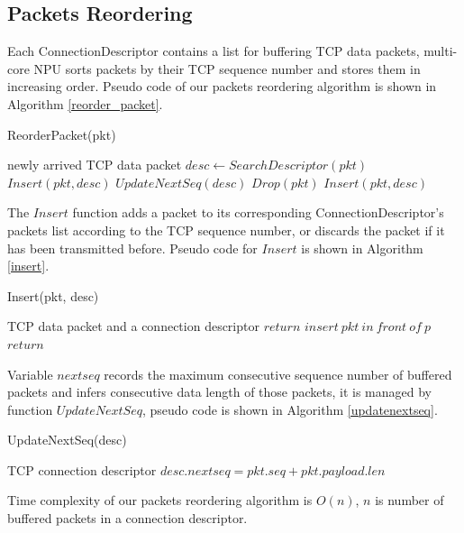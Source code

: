 \documentclass[conference]{IEEEtran}
\begin{document}
\subsection{Packets Reordering}
Each ConnectionDescriptor contains a list for buffering TCP data packets, multi-core NPU sorts packets by their TCP sequence number and stores them in increasing order. Pseudo code of our packets reordering algorithm is shown in Algorithm \ref{reorder_packet}.
\begin{algorithm}
\caption{ReorderPacket(pkt)}
\label{reorder_packet}
\begin{algorithmic}
\REQUIRE newly arrived TCP data packet
\STATE $desc \leftarrow SearchDescriptor(pkt)$
\STATE $Insert(pkt, desc)$
\STATE $UpdateNextSeq(desc)$
\ELSE {}
    \STATE $Drop(pkt)$
    \ELSE \STATE $Insert(pkt, desc)$
    \ENDIF
\ENDIF
\end{algorithmic}
\end{algorithm}
The $Insert$ function adds a packet to its corresponding ConnectionDescriptor's packets list according to the TCP sequence number, or discards the packet if it has been transmitted before. Pseudo code for $Insert$ is shown in Algorithm \ref{insert}.
\begin{algorithm}
\caption{Insert(pkt, desc)}
\label{insert}
\begin{algorithmic}
\REQUIRE TCP data packet and a connection descriptor
\STATE $return$
\ELSE {}
    \STATE $insert\ pkt\ in\ front\ of\ p$
    \STATE $return$
    \ENDIF
\ENDIF
\ENDFOR
\end{algorithmic}
\end{algorithm}
Variable $nextseq$ records the maximum consecutive sequence number of buffered packets and infers consecutive data length of those packets, it is managed by function $UpdateNextSeq$, pseudo code is shown in Algorithm \ref{updatenextseq}.
\begin{algorithm}
\caption{UpdateNextSeq(desc)}
\label{updatenextseq}
\begin{algorithmic}
\REQUIRE TCP connection descriptor
\STATE $desc.nextseq = pkt.seq + pkt.payload.len$
\ENDIF
\ENDFOR
\end{algorithmic}
\end{algorithm}
Time complexity of our packets reordering algorithm is $O(n)$, $n$ is number of buffered packets in a connection descriptor.
\end{document}
